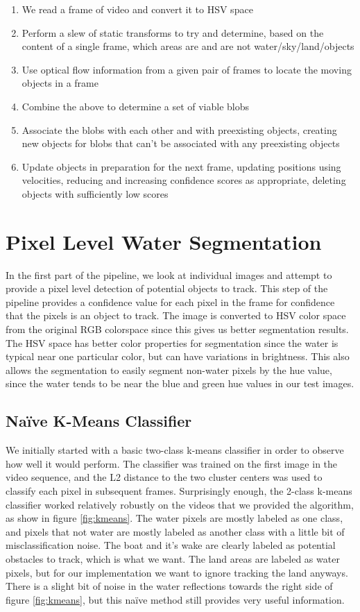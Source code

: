 \documentclass{article}
\begin{document}
\begin{enumerate}
\item We read a frame of video and convert it to HSV space
\item Perform a slew of static transforms to try and determine,
      based on the content of a single frame, which areas are and
      are not water/sky/land/objects
\item Use optical flow information from a given pair of frames to
      locate the moving objects in a frame
\item Combine the above to determine a set of viable blobs
\item Associate the blobs with each other and with preexisting objects,
      creating new objects for blobs that can't be associated with any
      preexisting objects
\item Update objects in preparation for the next frame, updating
      positions using velocities, reducing and increasing confidence
      scores as appropriate, deleting objects with sufficiently low
      scores
\end{enumerate}

\section{Pixel Level Water Segmentation}
In the first part of the pipeline, we look at individual images and attempt to
provide a pixel level detection of potential objects to track.  This step of the
pipeline provides a confidence value for each pixel in the frame for confidence
that the pixels is an object to track.
The image is converted to HSV color space from the original RGB colorspace since
this gives us better segmentation results. The HSV space has better color
properties for segmentation since the water is typical near one particular
color, but can have variations in brightness.  This also allows the segmentation
to easily segment non-water pixels by the hue value, since the water tends to be
near the blue and green hue values in our test images.

\subsection{Na\"ive K-Means Classifier}
We initially started with a basic two-class k-means classifier in order to
observe how well it would perform.  The classifier was trained on the first
image in the video sequence, and the L2 distance to the two cluster centers was
used to classify each pixel in subsequent frames.  Surprisingly enough, the
2-class k-means classifier worked relatively robustly on the videos that we
provided the algorithm, as show in figure \ref{fig:kmeans}.  The water pixels
are mostly labeled as one class, and pixels that not water are mostly labeled as
another class with a little bit of misclassification noise.  The boat and it's
wake are clearly labeled as potential obstacles to track, which is what we want.
The land areas are labeled as water pixels, but for our implementation we want
to ignore tracking the land anyways. There is a slight bit of noise in the water
reflections towards the right side of figure \ref{fig:kmeans}, but this na\"ive
method still provides very useful information.
\end{document}
